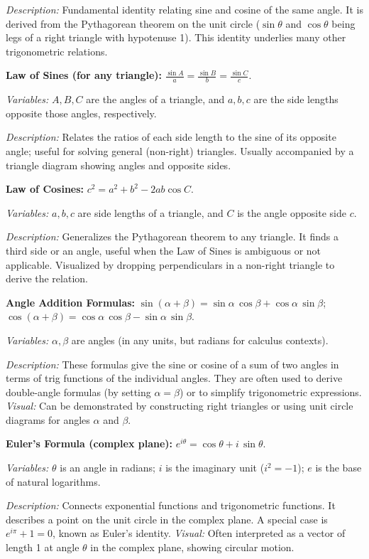 \documentclass{article}
\begin{document}
\textit{Description:} Fundamental identity relating sine and cosine of the same angle. It is derived from the Pythagorean theorem on the unit circle ($\sin\theta$ and $\cos\theta$ being legs of a right triangle with hypotenuse 1). This identity underlies many other trigonometric relations.

\textbf{Law of Sines (for any triangle):} $\displaystyle \frac{\sin A}{a} = \frac{\sin B}{b} = \frac{\sin C}{c}$.

\textit{Variables:} $A, B, C$ are the angles of a triangle, and $a, b, c$ are the side lengths opposite those angles, respectively.

\textit{Description:} Relates the ratios of each side length to the sine of its opposite angle; useful for solving general (non-right) triangles. Usually accompanied by a triangle diagram showing angles and opposite sides.

\textbf{Law of Cosines:} $c^2 = a^2 + b^2 - 2ab\cos C$.

\textit{Variables:} $a, b, c$ are side lengths of a triangle, and $C$ is the angle opposite side $c$.

\textit{Description:} Generalizes the Pythagorean theorem to any triangle. It finds a third side or an angle, useful when the Law of Sines is ambiguous or not applicable. Visualized by dropping perpendiculars in a non-right triangle to derive the relation.

\textbf{Angle Addition Formulas:} $\displaystyle \sin(\alpha+\beta) = \sin\alpha\,\cos\beta + \cos\alpha\,\sin\beta$;  $\displaystyle \cos(\alpha+\beta) = \cos\alpha\,\cos\beta - \sin\alpha\,\sin\beta$.

\textit{Variables:} $\alpha, \beta$ are angles (in any units, but radians for calculus contexts).

\textit{Description:} These formulas give the sine or cosine of a sum of two angles in terms of trig functions of the individual angles. They are often used to derive double-angle formulas (by setting $\alpha=\beta$) or to simplify trigonometric expressions. \textit{Visual:} Can be demonstrated by constructing right triangles or using unit circle diagrams for angles $\alpha$ and $\beta$.

\textbf{Euler’s Formula (complex plane):} $e^{i\theta} = \cos\theta + i\,\sin\theta$.

\textit{Variables:} $\theta$ is an angle in radians; $i$ is the imaginary unit ($i^2 = -1$); $e$ is the base of natural logarithms.

\textit{Description:} Connects exponential functions and trigonometric functions. It describes a point on the unit circle in the complex plane. A special case is $e^{i\pi} + 1 = 0$, known as Euler's identity. \textit{Visual:} Often interpreted as a vector of length 1 at angle $\theta$ in the complex plane, showing circular motion.
\end{document}
